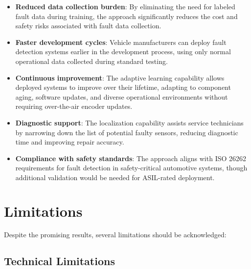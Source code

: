 \begin{itemize}
    \item \textbf{Reduced data collection burden}: By eliminating the need for labeled fault data during training, the approach significantly reduces the cost and safety risks associated with fault data collection.

    \item \textbf{Faster development cycles}: Vehicle manufacturers can deploy fault detection systems earlier in the development process, using only normal operational data collected during standard testing.

    \item \textbf{Continuous improvement}: The adaptive learning capability allows deployed systems to improve over their lifetime, adapting to component aging, software updates, and diverse operational environments without requiring over-the-air encoder updates.

    \item \textbf{Diagnostic support}: The localization capability assists service technicians by narrowing down the list of potential faulty sensors, reducing diagnostic time and improving repair accuracy.

    \item \textbf{Compliance with safety standards}: The approach aligns with ISO 26262 requirements for fault detection in safety-critical automotive systems, though additional validation would be needed for ASIL-rated deployment.
\end{itemize}

\section{Limitations}

Despite the promising results, several limitations should be acknowledged:

\subsection{Technical Limitations}


